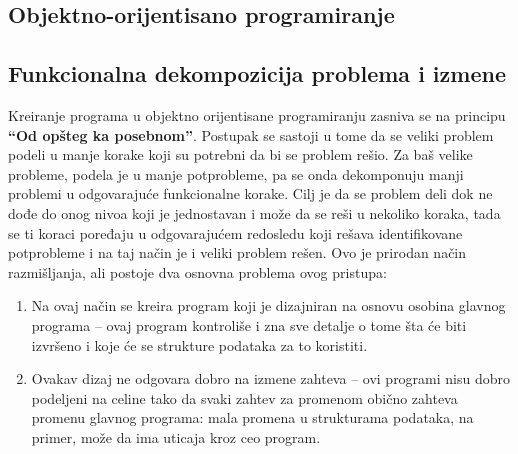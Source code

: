 \documentclass[../main.tex]{subfiles}
\begin{document}
\begin{boxnaslovi}
\section{Objektno-orijentisano programiranje}
\end{boxnaslovi}

\subsection{Funkcionalna dekompozicija problema i izmene}

Kreiranje programa u objektno orijentisane programiranju zasniva se na principu {\bf ``Od opšteg ka posebnom''}. Postupak se sastoji u tome da se veliki problem podeli u manje korake koji su potrebni da bi se problem rešio. Za baš velike probleme, podela je u manje potprobleme, pa se onda dekomponuju manji problemi u odgovarajuće funkcionalne korake. Cilj je da se problem deli dok ne dođe do onog nivoa koji je jednostavan i može da se reši u nekoliko koraka, tada se ti koraci poređaju u odgovarajućem redosledu koji rešava identifikovane potprobleme i na taj način je i veliki problem rešen. Ovo je prirodan način razmišljanja, ali postoje dva osnovna problema ovog pristupa:
\begin{enumerate}
\item Na ovaj način se kreira program koji je dizajniran na osnovu osobina glavnog programa -- ovaj program kontroliše i zna sve detalje o tome šta će biti izvršeno i koje će se strukture podataka za to koristiti.
\item Ovakav dizaj ne odgovara dobro na izmene zahteva -- ovi programi nisu dobro podeljeni na celine tako da svaki zahtev za promenom obično zahteva promenu glavnog programa: mala promena u strukturama podataka, na primer, može da ima uticaja kroz ceo program.
\end{enumerate}
\end{document}
